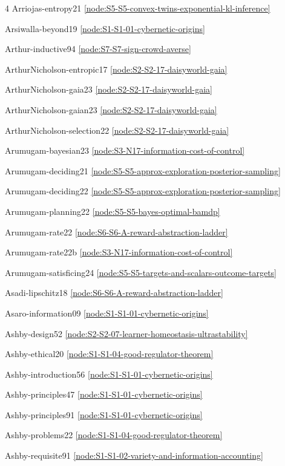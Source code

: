 \documentclass[10pt]{article}
\begin{document}
{\begin{multicols}{4}
Arriojas-entropy21 \hfill \ref{node:S5-S5-convex-twins-exponential-kl-inference}\par
Arsiwalla-beyond19 \hfill \ref{node:S1-S1-01-cybernetic-origins}\par
Arthur-inductive94 \hfill \ref{node:S7-S7-sign-crowd-averse}\par
ArthurNicholson-entropic17 \hfill \ref{node:S2-S2-17-daisyworld-gaia}\par
ArthurNicholson-gaia23 \hfill \ref{node:S2-S2-17-daisyworld-gaia}\par
ArthurNicholson-gaian23 \hfill \ref{node:S2-S2-17-daisyworld-gaia}\par
ArthurNicholson-selection22 \hfill \ref{node:S2-S2-17-daisyworld-gaia}\par
Arumugam-bayesian23 \hfill \ref{node:S3-N17-information-cost-of-control}\par
Arumugam-deciding21 \hfill \ref{node:S5-S5-approx-exploration-posterior-sampling}\par
Arumugam-deciding22 \hfill \ref{node:S5-S5-approx-exploration-posterior-sampling}\par
Arumugam-planning22 \hfill \ref{node:S5-S5-bayes-optimal-bamdp}\par
Arumugam-rate22 \hfill \ref{node:S6-S6-A-reward-abstraction-ladder}\par
Arumugam-rate22b \hfill \ref{node:S3-N17-information-cost-of-control}\par
Arumugam-satisficing24 \hfill \ref{node:S5-S5-targets-and-scalars-outcome-targets}\par
Asadi-lipschitz18 \hfill \ref{node:S6-S6-A-reward-abstraction-ladder}\par
Asaro-information09 \hfill \ref{node:S1-S1-01-cybernetic-origins}\par
Ashby-design52 \hfill \ref{node:S2-S2-07-learner-homeostasis-ultrastability}\par
Ashby-ethical20 \hfill \ref{node:S1-S1-04-good-regulator-theorem}\par
Ashby-introduction56 \hfill \ref{node:S1-S1-01-cybernetic-origins}\par
Ashby-principles47 \hfill \ref{node:S1-S1-01-cybernetic-origins}\par
Ashby-principles91 \hfill \ref{node:S1-S1-01-cybernetic-origins}\par
Ashby-problems22 \hfill \ref{node:S1-S1-04-good-regulator-theorem}\par
Ashby-requisite91 \hfill \ref{node:S1-S1-02-variety-and-information-accounting}\par

\end{multicols}}
\end{document}
